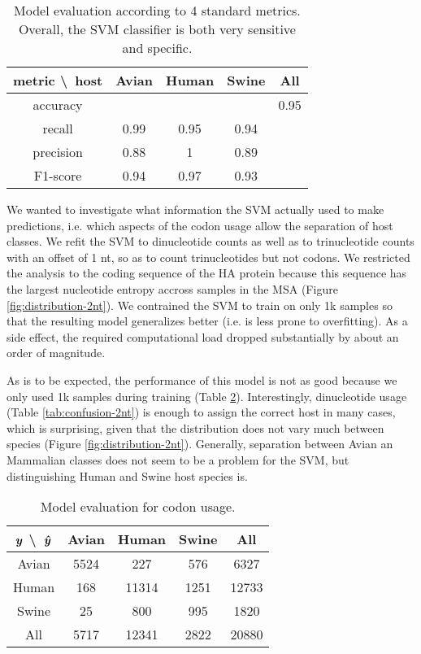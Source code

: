 \begin{table}[htbp]
    \centering
    \begin{tabular}{c | c | c | c | c}
        metric \textbackslash~host & Avian & Human & Swine &  All \\
        \hline
        accuracy & \phantom{} & \phantom{} & \phantom{} & 0.95 \\
        recall & 0.99 & 0.95 & 0.94 & \phantom{} \\
        precision & 0.88 & 1 & 0.89 & \phantom{} \\
        F1-score & 0.94 & 0.97 & 0.93 & \phantom{} \\
    \end{tabular}
    \caption[Model evaluation according to 4 standard metrics.]{Model evaluation according to 4 standard metrics. Overall, the SVM classifier is both very sensitive and specific.}
    \label{tab:modeleval}
\end{table}


We wanted to investigate what information the SVM actually used to make predictions, i.e. which aspects of the codon usage allow the separation of host classes. We refit the SVM to dinucleotide counts as well as to trinucleotide counts with an offset of 1 nt, so as to count trinucleotides but not codons. We restricted the analysis to the coding sequence of the HA protein because this sequence has the largest nucleotide entropy accross samples in the MSA (Figure \ref{fig:distribution-2nt}). We contrained the SVM to train on only 1k samples so that the resulting model generalizes better (i.e. is less prone to overfitting). As a side effect, the required computational load dropped substantially by about an order of magnitude.

As is to be expected, the performance of this model is not as good because we only used 1k samples during training (Table \ref{tab:confusion-3nt}). Interestingly, dinucleotide usage (Table \ref{tab:confusion-2nt}) is enough to assign the correct host in many cases, which is surprising, given that the distribution does not vary much between species (Figure \ref{fig:distribution-2nt}). Generally, separation between Avian an Mammalian classes does not seem to be a problem for the SVM, but distinguishing Human and Swine host species is.


\begin{table}[htbp]
    \centering
    \begin{tabular}{c | c | c | c | c}
        $\hm{y}$ \textbackslash~$\hm{\hat{y}}$ & Avian & Human & Swine & All \\
        \hline
        Avian   & 5524  & 227    & 576    & 6327 \\
        Human   & 168   & 11314    & 1251   & 12733 \\
        Swine   & 25    & 800     & 995   & 1820  \\
        All     & 5717  & 12341   & 2822   & 20880 \\
    \end{tabular}
    \caption{Model evaluation for codon usage.}
    \label{tab:confusion-3nt}
\end{table}


